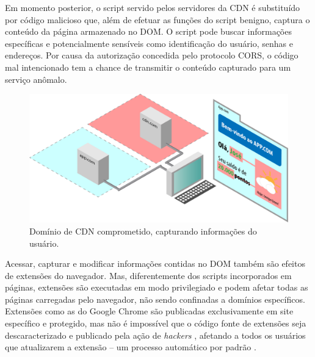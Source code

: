 Em momento posterior, o script servido pelos servidores da CDN é substituído por código malicioso que, além de efetuar as funções do script benigno, captura o conteúdo da página armazenado no DOM. O script pode buscar informações específicas e potencialmente sensíveis como identificação do usuário, senhas e endereços. Por causa da autorização concedida pelo protocolo CORS, o código mal intencionado tem a chance de transmitir o conteúdo capturado para um serviço anômalo.

\begin{figure}
	\centering
	\includegraphics[width=15cm]{diagramas/diagrama02.pdf}
	\caption{Domínio de CDN comprometido, capturando informações do usuário.}
	\label{Fig: diagrama02}
\end{figure}

Acessar, capturar e modificar informações contidas no DOM também são efeitos de extensões do navegador. Mas, diferentemente dos scripts incorporados em páginas, extensões são executadas em modo privilegiado e podem afetar todas as páginas carregadas pelo navegador, não sendo confinadas a domínios específicos. Extensões como as do Google Chrome são publicadas exclusivamente em site específico e protegido, mas não é impossível que o código fonte de extensões seja descaracterizado e publicado pela ação de \textit{hackers} \cite{Spring2017}, afetando a todos os usuários que atualizarem a extensão -- um processo automático por padrão \cite{Google2017}. 




